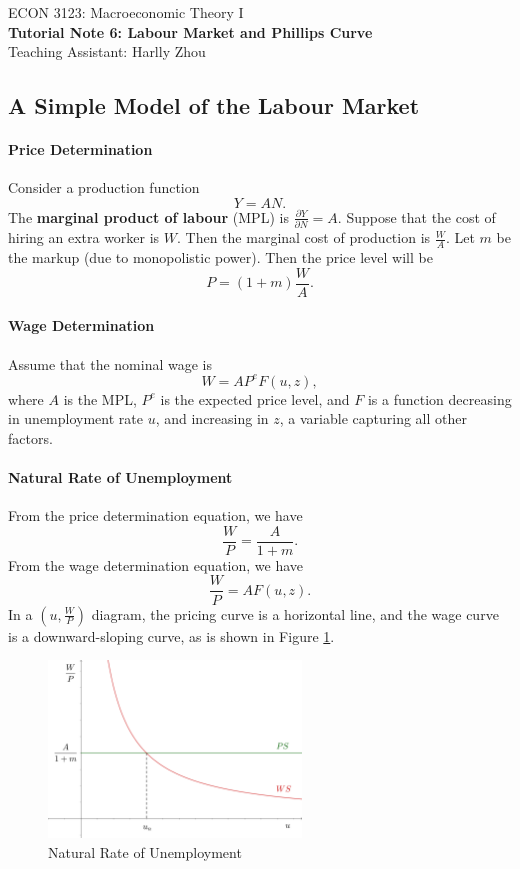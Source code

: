 \documentclass[12pt]{article}
\begin{document}
\begin{center}
    ECON 3123: Macroeconomic Theory I\\
    {\large \textbf{Tutorial Note 6: Labour Market and Phillips Curve}}\\
    Teaching Assistant: Harlly Zhou
\end{center}

\subsection*{A Simple Model of the Labour Market}
\paragraph{Price Determination} Consider a production function
\[Y = AN.\]
The \textbf{marginal product of labour} (MPL) is $\frac{\partial Y}{\partial N} = A$. Suppose that the cost of hiring an extra worker is $W$. Then the marginal cost of production is $\frac{W}{A}$. Let $m$ be the markup (due to monopolistic power). Then the price level will be
\[ P = (1+m)\frac{W}{A}.\]

\paragraph{Wage Determination} Assume that the nominal wage is
\[W = A P^e F(u,z),\]
where $A$ is the MPL, $P^e$ is the expected price level, and $F$ is a function decreasing in unemployment rate $u$, and increasing in $z$, a variable capturing all other factors.

\paragraph{Natural Rate of Unemployment} From the price determination equation, we have
\[\frac{W}{P} = \frac{A}{1+m}.\]
From the wage determination equation, we have
\[\frac{W}{P} = AF(u,z).\]
In a $\left(u, \frac{W}{P}\right)$ diagram, the pricing curve is a horizontal line, and the wage curve is a downward-sloping curve, as is shown in Figure \ref{fig:wu_01}.

\begin{figure}[htp]
    \centering
    \includegraphics[width=0.6\textwidth]{wu_01.png}
    \caption{Natural Rate of Unemployment}
    \label{fig:wu_01}
\end{figure}
\end{document}
